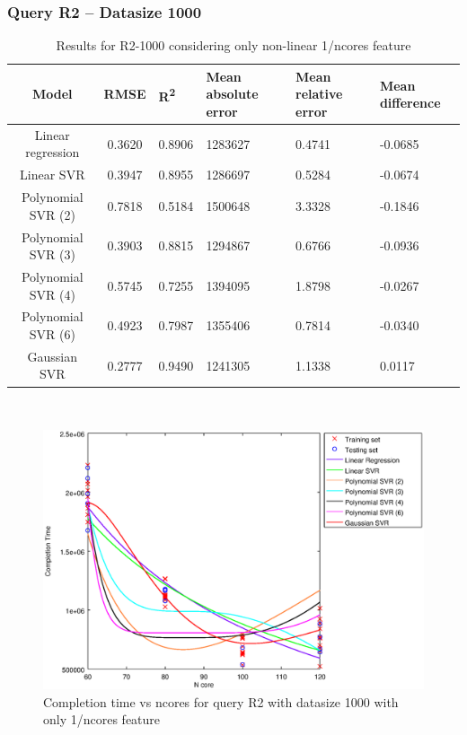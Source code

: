 \documentclass[a4paper,11pt]{article}
\begin{document}
\newpage
\subsubsection{Query R2 -- Datasize 1000}
\begin{table}[H]
	\centering
	\begin{adjustbox}{center}
		\begin{tabular}{c | c M{1.2cm} M{2.5cm} M{2.5cm} M{1.8cm}}
			Model & RMSE & R\textsuperscript{2} & Mean absolute error & Mean relative error & Mean difference \tabularnewline
			\hline
			Linear regression & 0.3620 & 0.8906 & 1283627 & 0.4741 & -0.0685 \\
			Linear SVR & 0.3947 & 0.8955 & 1286697 & 0.5284 & -0.0674 \\
			Polynomial SVR (2) & 0.7818 & 0.5184 & 1500648 & 3.3328 & -0.1846 \\
			Polynomial SVR (3) & 0.3903 & 0.8815 & 1294867 & 0.6766 & -0.0936 \\
			Polynomial SVR (4) & 0.5745 & 0.7255 & 1394095 & 1.8798 & -0.0267 \\
			Polynomial SVR (6) & 0.4923 & 0.7987 & 1355406 & 0.7814 & -0.0340 \\
			Gaussian SVR & 0.2777 & 0.9490 & 1241305 & 1.1338 & 0.0117 \\
		\end{tabular}
	\end{adjustbox}
	\\
	\caption{Results for R2-1000 considering only non-linear 1/ncores feature}
	\label{table_R2_prediction_all}
\end{table}

\begin {figure}[hbtp]
\centering
\includegraphics[width=\textwidth]{output/R2_1000_ONLY_1_OVER_NCORES/plot_R2_1000.eps}
\caption {Completion time vs ncores for query R2 with datasize 1000 with only 1/ncores feature}
\end {figure}
\end{document}
